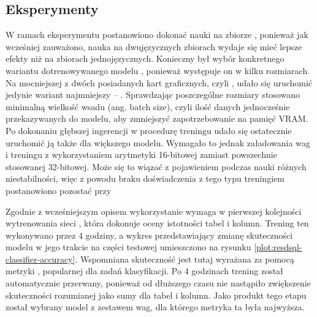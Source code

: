 \subsection{Eksperymenty}
W ramach eksperymentu postanowiono dokonać nauki  na zbiorze , ponieważ jak wcześniej zauważono, nauka na dwujęzycznych zbiorach wydaje się mieć lepsze efekty niż na zbiorach jednojęzycznych. Konieczny był wybór konkretnego wariantu dotrenowywanego modelu , ponieważ występuje on w kilku rozmiarach. Na mocniejszej z dwóch posiadanych kart graficznych, czyli , udało się uruchomić jedynie wariant najmniejszy -- . Sprawdzając poszczególne rozmiary stosowano minimalną wielkość wsadu (ang. batch size), czyli ilość danych jednocześnie przekazywanych do modelu, aby zmniejszyć zapotrzebowanie na pamięć VRAM. Po dokonaniu głębszej ingerencji w procedurę treningu udało się ostatecznie uruchomić ją także dla większego modelu. Wymagało to jednak załadowania wag i treningu z wykorzystaniem arytmetyki 16-bitowej zamiast powszechnie stosowanej 32-bitowej. Może się to wiązać z pojawieniem podczas nauki różnych niestabilności, więc z powodu braku doświadczenia z tego typu treningiem postanowiono pozostać przy 

Zgodnie z wcześniejszym opisem wykorzystanie  wymaga w pierwszej kolejności wytrenowania sieci , która dokonuje oceny istotności tabel i kolumn. Trening ten wykonywano przez 4 godziny, a wykres przedstawiający zmianę skuteczności modelu w jego trakcie na części testowej umieszczono na rysunku \ref{plot:resdsql-classifier-accuracy}. Wspomniana skuteczność jest tutaj wyrażana za pomocą metryki  , popularnej dla zadań klasyfikacji. Po 4 godzinach trening został automatycznie przerwany, ponieważ od dłuższego czasu nie nastąpiło zwiększenie skuteczności rozumianej jako sumy  dla tabel i kolumn. Jako produkt tego etapu został wybrany model z zestawem wag, dla którego metryka ta była najwyższa.

